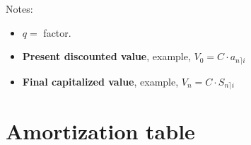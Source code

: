 \documentclass[10pt, a4paper]{article}
\begin{document}
\vspace*{0.5cm}

Notes:

\begin{itemize}[leftmargin=*]
	\item[] $q =$ factor.
	\item[] \textbf{Present discounted value}, example, $V_{0} = C \cdot a_{n \rceil i}$
	\item[] \textbf{Final capitalized value}, example, $V_{n} = C \cdot S_{n \rceil i}$
\end{itemize}

\newpage

\section*{Amortization table}
\end{document}
